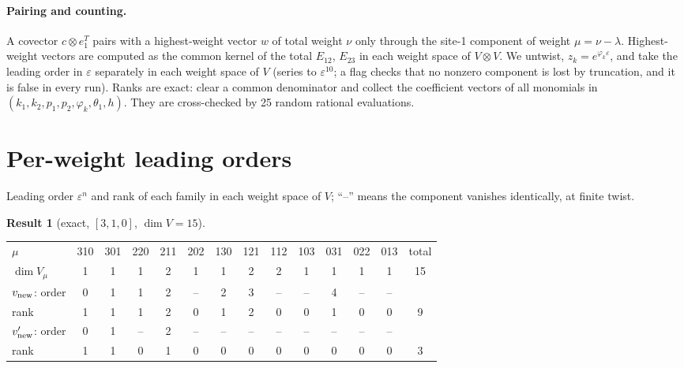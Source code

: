 \documentclass[11pt]{article}
\theoremstyle{definition}
\newtheorem{result}{Result}
\theoremstyle{remark}
\begin{document}
\paragraph{Pairing and counting.}
A covector $c\otimes e_1^T$ pairs with a highest-weight vector $w$ of total weight $\nu$ only through the site-1 component of weight $\mu=\nu-\lambda$. Highest-weight vectors are computed as the common kernel of the total $E_{12}$, $E_{23}$ in each weight space of $V\otimes V$. We untwist, $z_k=e^{\varphi_k\varepsilon}$, and take the leading order in $\varepsilon$ separately in each weight space of $V$ (series to $\varepsilon^{10}$; a flag checks that no nonzero component is lost by truncation, and it is false in every run). Ranks are exact: clear a common denominator and collect the coefficient vectors of all monomials in $(k_1,k_2,p_1,p_2,\varphi_k,\theta_1,h)$. They are cross-checked by 25 random rational evaluations.

\section{Per-weight leading orders}

Leading order $\varepsilon^n$ and rank of each family in each weight space of $V$; ``--'' means the component vanishes identically, at finite twist.

\begin{result}[{exact, $[3,1,0]$, $\dim V=15$}]\label{res:w310}
\begin{center}
\begin{tabular}{lccccccccccccc}\toprule
$\mu$ & 310 & 301 & 220 & 211 & 202 & 130 & 121 & 112 & 103 & 031 & 022 & 013 & total\\
$\dim V_\mu$ & 1 & 1 & 1 & 2 & 1 & 1 & 2 & 2 & 1 & 1 & 1 & 1 & 15\\\midrule
$v_{\rm new}$: order & 0 & 1 & 1 & 2 & -- & 2 & 3 & -- & -- & 4 & -- & -- & \\
\phantom{$v_{\rm new}$:} rank & 1 & 1 & 1 & 2 & 0 & 1 & 2 & 0 & 0 & 1 & 0 & 0 & 9\\\midrule
$v'_{\rm new}$: order & 0 & 1 & -- & 2 & -- & -- & -- & -- & -- & -- & -- & -- & \\
\phantom{$v'_{\rm new}$:} rank & 1 & 1 & 0 & 1 & 0 & 0 & 0 & 0 & 0 & 0 & 0 & 0 & 3\\\bottomrule
\end{tabular}
\end{center}
\end{result}
\end{document}
